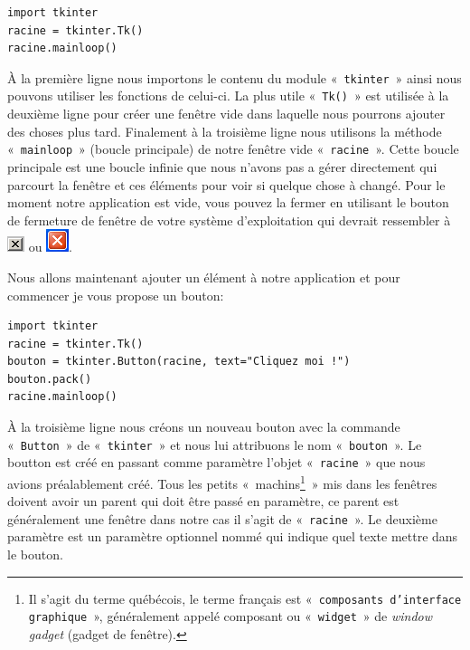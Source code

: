\begin{Verbatim}[frame=single,rulecolor=\color{mbleu}, label=à taper et sauver dans un nouveau fichier .py]
import tkinter
racine = tkinter.Tk()
racine.mainloop()
\end{Verbatim}

À la première ligne nous importons le contenu du module « \texttt{tkinter} » ainsi nous pouvons utiliser les fonctions de celui-ci. La plus utile « \texttt{Tk()} »  est utilisée à la deuxième ligne pour créer une fenêtre vide dans laquelle nous pourrons ajouter des choses plus tard. Finalement à la troisième ligne nous utilisons la méthode « \texttt{mainloop} » (boucle principale) de notre fenêtre vide « \texttt{racine} ». Cette boucle principale est une boucle infinie que nous n'avons pas a gérer directement qui parcourt la fenêtre et ces éléments pour voir si quelque chose à changé. Pour le moment notre application est vide, vous pouvez la fermer en utilisant le bouton de fermeture de fenêtre de votre système d'exploitation qui devrait ressembler à  \includegraphics[scale=1]{images/fermer} ou \includegraphics[scale=1]{images/fermer2}.

Nous allons maintenant ajouter un élément à notre application et pour commencer je vous propose un bouton:
\begin{Verbatim}[frame=single,rulecolor=\color{mbleu}, label=à taper et sauver dans un nouveau fichier .py]
import tkinter
racine = tkinter.Tk()
bouton = tkinter.Button(racine, text="Cliquez moi !")
bouton.pack()
racine.mainloop()
\end{Verbatim}

À la troisième ligne nous créons un nouveau bouton avec la commande « \texttt{Button} » de « \texttt{tkinter} » et nous lui attribuons le nom « \texttt{bouton} ». Le boutton est créé en passant comme paramètre l'objet « \texttt{racine} »  que nous avions préalablement créé. Tous les petits « machins\footnote{Il s'agit du terme québécois, le terme français est « \texttt{composants d'interface graphique} », généralement appelé composant ou  « \texttt{widget} »  de \emph{window gadget} (gadget de fenêtre).} » mis dans les fenêtres doivent avoir un parent qui doit être passé en paramètre, ce parent est généralement une fenêtre dans notre cas il s'agit de « \texttt{racine} ». Le deuxième paramètre est un paramètre optionnel nommé qui indique quel texte mettre dans le bouton.

